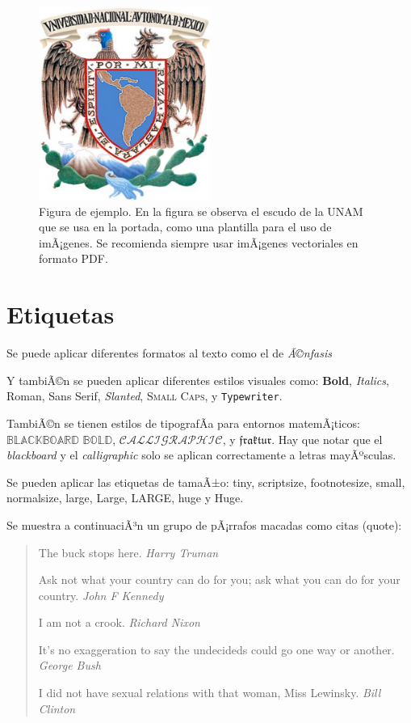 \documentclass[11pt,spanish]{report}
\begin{document}
\begin{figure}[htp]
\centering
\includegraphics[width=0.5\textwidth]{Escudo-UNAM.pdf}
\caption[Figura de ejemplo]{Figura de ejemplo. En la figura se observa el escudo de la UNAM que se usa en la portada, como una plantilla para el uso de imÃ¡genes. Se recomienda siempre usar imÃ¡genes vectoriales en formato PDF.}
\label{fig:figura_ejemplo}
\end{figure}


\section{Etiquetas}

Se puede aplicar diferentes formatos al texto como el de \emph{Ã©nfasis}

Y tambiÃ©n se pueden aplicar diferentes estilos visuales como: \textbf{Bold}, \textit{Italics},
\textrm{Roman}, \textsf{Sans Serif}, \textsl{Slanted}, \textsc{Small Caps},
y \texttt{Typewriter}.

TambiÃ©n se tienen estilos de tipografÃ­a para entornos matemÃ¡ticos: $\mathbb{BLACKBOARD}$
$\mathbb{BOLD}$, $\mathcal{CALLIGRAPHIC}$, y $\mathfrak{fraktur}$. Hay que notar que el \emph{blackboard} y el \emph{calligraphic} solo se aplican correctamente a letras mayÃºsculas.

Se pueden aplicar las etiquetas de tamaÃ±o: {\tiny tiny}, {\scriptsize scriptsize},
{\footnotesize footnotesize}, {\small small}, {\normalsize normalsize},
{\large large}, {\Large Large}, {\LARGE LARGE}, {\huge huge} y {\Huge Huge}.

Se muestra a continuaciÃ³n un grupo de pÃ¡rrafos macadas como citas (quote):

\begin{quote}
The buck stops here. \emph{Harry Truman}

Ask not what your country can do for you; ask what you can do for your
country. \emph{John F Kennedy}

I am not a crook. \emph{Richard Nixon}

It's no exaggeration to say the undecideds could go one way or another.
\emph{George Bush}

I did not have sexual relations with that woman, Miss Lewinsky. \emph{Bill Clinton}
\end{quote}
\end{document}
